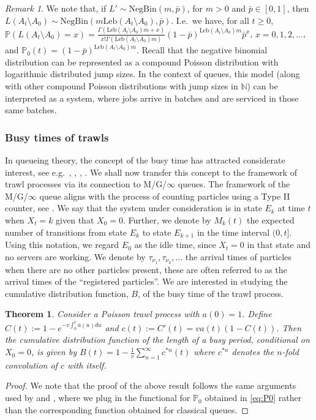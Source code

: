 \documentclass{article}
\theoremstyle{plain}
\newtheorem{theorem}{Theorem}
\theoremstyle{definition}
\theoremstyle{remark}
\newtheorem{remark}{Remark}[section]
\newcommand{\Leb}{\ensuremath{\mathrm{Leb}}}
\begin{document}
\begin{remark} We note that, if $L'\sim \mathrm{NegBin}(m,\bar p)$, for  $m>0$ and $\bar p \in [0,1]$, then  $L(A_t\setminus A_0)  \sim \mathrm{NegBin}(m \Leb(A_t\setminus A_0),\bar p)$.  
I.e.~we have, for all $t \geq 0$,
		$\mathbb{P}(L(A_t\setminus A_0)  = x) =  \frac{\Gamma(\Leb(A_t\setminus A_0)m+x)}{x!\Gamma(\Leb(A_t\setminus A_0)m)} (1-\bar p)^{\Leb(A_t\setminus A_0)m} \bar p^x$, $x= 0, 1, 2, \ldots$,
	and
   $\mathbb{P}_0(t)=   (1-\bar p)^{\Leb(A_t\setminus A_0)m}$. 
 Recall that the negative binomial distribution can be represented as a compound Poisson distribution with logarithmic distributed jump sizes. In the context of queues, this model (along with other compound Poisson distributions with jump sizes in $\mathbb{N}$) can be interpreted as a system, where jobs arrive in batches and are serviced in those same batches. 
\end{remark}

\subsubsection{Busy times of trawls}

In queueing theory, the concept of the busy time has attracted considerate interest, see e.g.~\cite{T1962}, \cite{Stadje1985},  \cite{LiuShi1996}, \cite{ARTALEJO2007}.
We shall now transfer this concept to the framework of trawl processes via its connection to M/G/$\infty$ queues.
The framework of the M/G/$\infty$ queue aligns with the process of counting particles using a Type II counter, see \citet[Chapter 6]{T1962}.
We say that the system under consideration is in state $E_k$ at time $t$ when $X_t=k$ given that $X_0=0$. Further, we denote by $M_k(t)$ the expected number of transitions from state $E_k$ to state $E_{k+1}$ in the time interval $(0,t]$. 
Using this notation, we regard $E_0$ as the idle time, since $X_t=0$ in that state and no servers are working. 
We denote by $\tau_{\nu_1}, \tau_{\nu_2}, \ldots$ the arrival times of particles when there are no other particles present, these are often referred to as the arrival times of the ``registered particles''. 
We are interested in studying the cumulative distribution function, $B$, of the busy time of the trawl process. 
\begin{theorem} Consider a Poisson trawl process with $a(0)=1$. Define
$C(t):=1-e^{-v \int_0^{t}a(u)du}$ and 
$c(t):=C'(t)=va(t)(1-C(t))$.
Then the 
    cumulative distribution function of the length of a busy period, conditional on $X_0=0$,  is given by
        $B(t)=1-\frac{1}{v}\sum_{n=1}^{\infty}c^{*n}(t)$
    where $c^{*n}$ denotes the $n$-fold convolution of $c$ with itself.
\end{theorem}
\begin{proof}
We note that the proof of the above result follows the same arguments used by 
\cite{Stadje1985} and \cite{T1962}, where we plug in the functional for $\mathbb{P}_0$ obtained in \eqref{eq:P0} rather than the corresponding function obtained for classical queues.
\end{proof}
\end{document}
